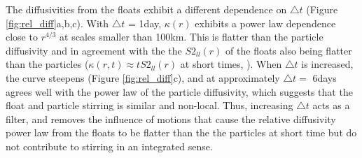 \documentclass[]{ametsoc}
\begin{document}

The diffusivities from the floats exhibit a different dependence on $\triangle t$ (Figure \ref{fig:rel_diff}a,b,c). With $\triangle t$ = 1day, $\kappa (r)$ exhibits a power law dependence close to $r^{4/3}$ at scales smaller than 100km. This is flatter than the particle diffusivity and in agreement with the the $S2_{ll}(r)$ of the floats also being flatter than the particles ($\kappa(r,t) \approx tS2_{ll}(r)$ at short times, \citet{babiano1990relative}). When $\triangle t$ is increased, the curve steepens (Figure \ref{fig:rel_diff}c), and at approximately $\triangle t = $ 6days agrees well with the power law of the particle diffusivity, which suggests that the float and particle stirring is similar and non-local. Thus, increasing $\triangle t$ acts as a filter, and removes the influence of motions that cause the relative diffusivity power law from the floats to be flatter than the the particles at short time but do not contribute to stirring in an integrated sense. 
\end{document}
